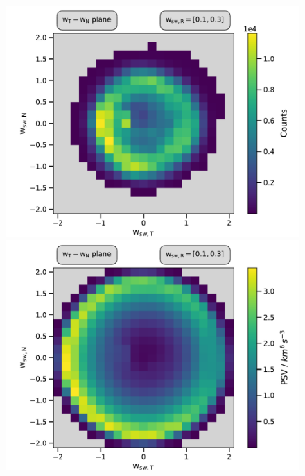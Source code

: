 \documentclass{beamer}
\begin{document}
\begin{frame}[plain]
\begin{columns}
	
	\column{4cm}
	\vspace{-0.5cm}
	\begin{figure}
		
		\includegraphics[scale=.28]{Pics/cart_lang_R_counts.pdf}
		\includegraphics[scale=.28]{Pics/cart_lang_R_norm.pdf}
		

\end{figure}
\end{columns}
\end{frame}
\end{document}
